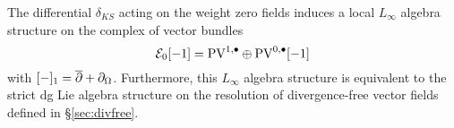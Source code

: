 \documentclass[11pt]{amsart}
\begin{document}
\begin{prop}
\label{prop:Linfty}
The differential $\delta_{KS}$ acting on the weight zero fields induces a local $L_\infty$ algebra structure on the complex of vector bundles 
\[
\mathcal E_0 [-1] = {\rm PV}^{1,\bullet} \oplus {\rm PV}^{0,\bullet}[-1]
\]
with $[-]_1 = \overline{\partial} + \partial_{\Omega}$. 
Furthermore, this $L_\infty$ algebra structure is equivalent to the strict dg Lie algebra structure on the resolution of divergence-free vector fields defined in \S \ref{sec:divfree}. 
\end{prop}


%
%
%
%
\end{document}
